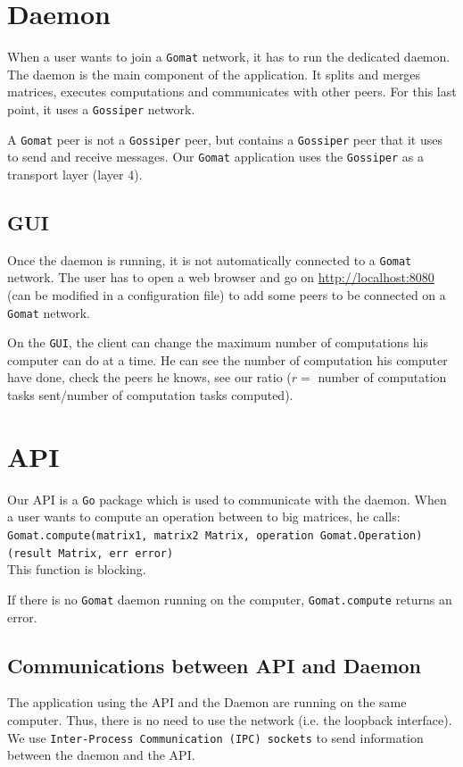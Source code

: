 \documentclass[a4paper,12pt]{article}
\newcommand{\Gossiper}{\texttt{Gossiper}\xspace}
\newcommand{\Gomat}{\texttt{Gomat}\xspace}
\newcommand{\Go}{\texttt{Go}\xspace}
\begin{document}
    \section{Daemon}
    When a user wants to join a \Gomat network, it has to run the dedicated daemon. The daemon is the main component of the application. It splits and merges matrices, executes computations and communicates with other peers. For this last point, it uses a \Gossiper network.

    A \Gomat peer is not a \Gossiper peer, but contains a \Gossiper peer that it uses to send and receive messages. Our \Gomat application uses the \Gossiper as a transport layer (layer 4).

    \subsection{GUI}
    Once the daemon is running, it is not automatically connected to a \Gomat network. The user has to open a web browser and go on \url{http://localhost:8080} (can be modified in a configuration file) to add some peers to be connected on a
    \Gomat network.
    
    On the \texttt{GUI}, the client can change the maximum number of computations his computer can do at a time. He can see
    the number of computation his computer have done, check the peers he knows, see our ratio
    ($r =$ number of computation tasks sent/{number of computation tasks computed}).

    \section{API}
    Our API is a \Go package which is used to communicate with the daemon. When a user wants to compute an operation between to big matrices, he calls:\\
    \texttt{Gomat.compute(matrix1, matrix2 Matrix, operation Gomat.Operation)(result Matrix, err error)}\\
    This function is blocking.

    If there is no \Gomat daemon running on the computer, \texttt{Gomat.compute} returns an error.

    \subsection{Communications between API and Daemon}
    The application using the API and the Daemon are running on the same computer. Thus, there is no need to use the network (i.e. the loopback interface).
    We use \texttt{Inter-Process Communication (IPC) sockets} to send information between the daemon and the API.
\end{document}
